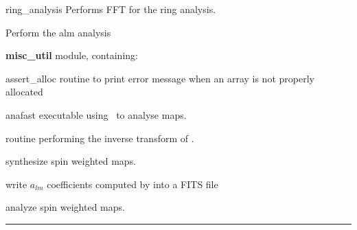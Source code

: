\begin{modules}
  \begin{sulist}{} %
  \item[ring\_analysis] Performs FFT for the ring analysis.
  \item[\htmlref{map2alm}{sub:map2alm}] Perform the alm analysis
  \item[\textbf{misc\_util}] module, containing:
  \item[assert\_alloc] routine to print error message when an array is not
  properly allocated		
  \end{sulist}
\end{modules}

\begin{related}
  \begin{sulist}{} %
  \item[anafast] executable using \thedocid \ to analyse maps.
  \item[\htmlref{alm2map}{sub:alm2map}] routine performing the inverse transform of \thedocid.
  \item[\htmlref{alm2map\_spin}{sub:alm2map_spin}] synthesize spin weighted
maps.
  \item[\htmlref{dump\_alms}{sub:dump_alms}] write $a_{lm}$ coefficients
computed by \thedocid into a FITS file
  \item[\htmlref{map2alm\_spin}{sub:map2alm_spin}] analyze spin weighted maps.
  \end{sulist}
\end{related}

\rule{\hsize}{2mm}

\newpage
